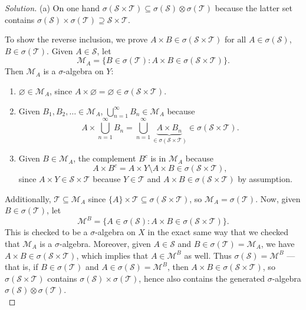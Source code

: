 \documentclass[10pt]{article}
\providecommand{\ii}{\item}
\newenvironment{soln}{\begin{proof}[Solution]}{\end{proof}}
\begin{document}
\begin{soln}
    (a) On one hand $\sigma(\mathcal S\times\mathcal T)\subseteq
    \sigma(\mathcal S)\otimes\sigma(\mathcal T)$ because
    the latter set contains
    $\sigma(\mathcal S)\times\sigma(\mathcal T)
    \supseteq \mathcal S\times\mathcal T$.

    To show the reverse inclusion, we prove
    $A\times B\in \sigma(\mathcal S\times\mathcal T)$ for all
    $A\in\sigma(\mathcal S)$, $B\in\sigma(\mathcal T)$.
    Given $A\in\mathcal S$, let
    \begin{equation*}
	\mathcal M_A
	= \{B\in\sigma(\mathcal T) : A\times B\in \sigma(\mathcal S\times\mathcal T)\}.
    \end{equation*}
    Then $\mathcal M_A$ is a $\sigma$-algebra on $Y$:
    \begin{enumerate}[(1)]
        \ii $\varnothing\in\mathcal M_A$, since
	$A\times\varnothing = \varnothing\in \sigma(\mathcal S\times\mathcal T)$.
	\ii Given $B_1,B_2,\ldots\in\mathcal M_A$,
	$\bigcup_{n=1}^\infty B_n\in\mathcal M_A$ because
	\begin{equation*}
	    A\times\bigcup_{n=1}^\infty B_n
	    = \bigcup_{n=1}^\infty \underbrace{A\times B_n}_
	    {\in \sigma(\mathcal S\times\mathcal T)}
	    \in \sigma(\mathcal S\times\mathcal T).
	\end{equation*}
	\ii Given $B\in\mathcal M_A$,
	the complement $B^c$ is in $\mathcal M_A$ because
	\begin{equation*}
	    A\times B^c = A\times Y\setminus A\times B\in
	    \sigma(\mathcal S\times\mathcal T),
	\end{equation*}
	since $A\times Y\in\mathcal S\times\mathcal T$
	because $Y\in\mathcal T$ and $A\times B\in\sigma(\mathcal S\times\mathcal T)$
	by assumption.
    \end{enumerate}
    Additionally, $\mathcal T\subseteq\mathcal M_A$ since
    $\{A\}\times\mathcal T\subseteq\sigma(\mathcal S\times\mathcal T)$,
    so $\mathcal M_A = \sigma(\mathcal T)$.
    Now, given $B\in \sigma(\mathcal T)$, let
    \begin{equation*}
	\mathcal M^B =
	\{A\in\sigma(\mathcal S) : A\times B\in \sigma(\mathcal S\times\mathcal T)\}.
    \end{equation*}
    This is checked to be a $\sigma$-algebra on $X$
    in the exact same way that we checked that $\mathcal M_A$ is a $\sigma$-algebra.
    Moreover, given $A\in\mathcal S$ and $B\in\sigma(\mathcal T) = \mathcal M_A$,
    we have $A\times B \in\sigma(\mathcal S\times\mathcal T)$,
    which implies that $A\in\mathcal M^B$ as well.
    Thus $\sigma(\mathcal S) = \mathcal M^B$ --- that is,
    if $B\in\sigma(\mathcal T)$ and $A\in\sigma(\mathcal S) = \mathcal M^B$,
    then $A\times B\in\sigma(\mathcal S\times\mathcal T)$,
    so $\sigma(\mathcal S\times\mathcal T)$ contains
    $\sigma(\mathcal S)\times\sigma(\mathcal T)$,
    hence also contains the generated $\sigma$-algebra
    $\sigma(\mathcal S)\otimes\sigma(\mathcal T)$.
    \\


\end{soln}
\end{document}
